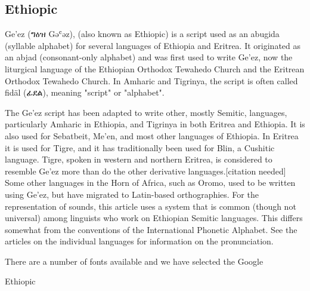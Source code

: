 
\subsection{Ethiopic}
Ge'ez (ግዕዝ Gəʿəz), (also known as Ethiopic) is a script used as an abugida (syllable alphabet) for several languages of Ethiopia and Eritrea. It originated as an abjad (consonant-only alphabet) and was first used to write Ge'ez, now the liturgical language of the Ethiopian Orthodox Tewahedo Church and the Eritrean Orthodox Tewahedo Church. In Amharic and Tigrinya, the script is often called fidäl (ፊደል), meaning "script" or "alphabet".

The Ge'ez script has been adapted to write other, mostly Semitic, languages, particularly Amharic in Ethiopia, and Tigrinya in both Eritrea and Ethiopia. It is also used for Sebatbeit, Me'en, and most other languages of Ethiopia. In Eritrea it is used for Tigre, and it has traditionally been used for Blin, a Cushitic language. Tigre, spoken in western and northern Eritrea, is considered to resemble Ge'ez more than do the other derivative languages.[citation needed] Some other languages in the Horn of Africa, such as Oromo, used to be written using Ge'ez, but have migrated to Latin-based orthographies.
For the representation of sounds, this article uses a system that is common (though not universal) among linguists who work on Ethiopian Semitic languages. This differs somewhat from the conventions of the International Phonetic Alphabet. See the articles on the individual languages for information on the pronunciation.

There are a number of fonts available and we have selected the Google 
\newfontfamily{}

\begin{scriptexample}[]{Ethiopic}
\end{scriptexample}